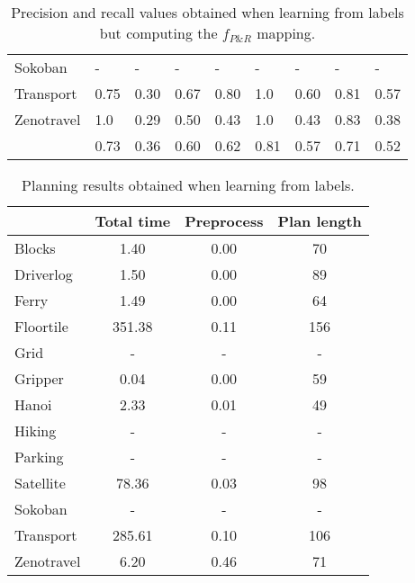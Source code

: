 \documentclass{article}
\begin{document}
\begin{table}
\begin{center}
\begin{scriptsize}
\begin{tabular}{l|l|l|l|l|l|l||l|l|}
					Sokoban & - & - & - & - & - & - & - & - \\ %
					Transport & 0.75 & 0.30 & 0.67 & 0.80 & 1.0 & 0.60 & 0.81 & 0.57 \\
					Zenotravel & 1.0 & 0.29 & 0.50 & 0.43 & 1.0 & 0.43 & 0.83 & 0.38 \\
					\hline
					\bf  & 0.73 & 0.36 & 0.60 & 0.62 & 0.81 & 0.57 & 0.71 & 0.52 \\
				\end{tabular}
	\end{scriptsize}
		\end{center}
 \caption{\small Precision and recall values obtained when learning from labels but computing the $f_{P\&R}$ mapping.}
\label{fig:labels}                
\end{table}

\begin{table}
	\begin{footnotesize}
		\begin{center}
			\begin{tabular}{l|c|c|c|}			
				& Total time & Preprocess & Plan length  \\
				\hline
				Blocks & 1.40 & 0.00 & 70  \\
				Driverlog & 1.50 & 0.00 & 89 \\
				Ferry & 1.49 & 0.00 & 64 \\
				Floortile & 351.38 & 0.11 & 156 \\
				Grid & - & - & - \\ %
				Gripper & 0.04 & 0.00 & 59 \\
				Hanoi & 2.33 & 0.01 & 49  \\
				Hiking & - & - & - \\ %
				Parking & - & - & - \\ %
				Satellite & 78.36 & 0.03 & 98 \\
				Sokoban & - & - & - \\ %
				Transport & 285.61 & 0.10 & 106 \\
				Zenotravel & 6.20 & 0.46 & 71 \\
			\end{tabular}
		\end{center}
	\end{footnotesize}
 \caption{\small Planning results obtained when learning from labels.}
\label{fig:planlabels}                        
\end{table}
\end{document}
